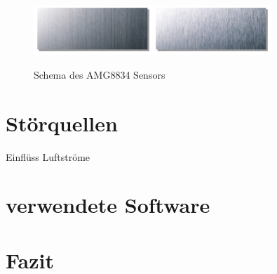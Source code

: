 \begin{figure}[H]
	\centering
	\includegraphics[width=0.8\textwidth]
	{fig/Edelstahl_matt.PNG}
	\caption[Schema des AMG8834 Sensors]{Schema des AMG8834 Sensors} \protect\cite{Edelstahl}
	\label{fig:Edelstahlmatt}
	
	
\end{figure}

\section{Störquellen}

Einflüss Luftströme





\section{verwendete Software}



\section{Fazit}

